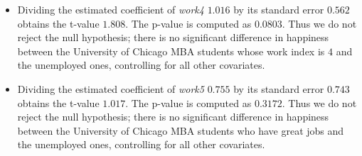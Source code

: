 \documentclass[11pt,letterpaper]{article}
\begin{document}
\begin{itemize}
\item Dividing the estimated coefficient of \emph{work4} $1.016$ by its standard error $0.562$ obtains the t-value $\mathbf{1.808}$. The p-value is computed as $0.0803$. Thus we do not reject the null hypothesis; there is no significant difference in happiness between the University of Chicago MBA students whose work index is $4$ and the unemployed ones, controlling for all other covariates.

\item Dividing the estimated coefficient of \emph{work5} $0.755$ by its standard error $0.743$ obtains the t-value $\mathbf{1.017}$. The p-value is computed as $0.3172$. Thus we do not reject the null hypothesis; there is no significant difference in happiness between the University of Chicago MBA students who have great jobs and the unemployed ones, controlling for all other covariates.
\end{itemize}
\end{document}
